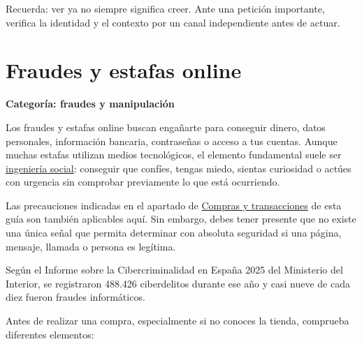 \documentclass[
  spanish,
  a4paper,
  openany]{book}
\begin{document}
Recuerda: ver ya no siempre significa creer. Ante una petición importante, verifica la identidad y el contexto por un canal independiente antes de actuar.

\section{Fraudes y estafas online}\label{fraudes-y-estafas-online}

\textbf{Categoría: fraudes y manipulación}

Los fraudes y estafas online buscan engañarte para conseguir dinero, datos personales, información bancaria, contraseñas o acceso a tus cuentas. Aunque muchas estafas utilizan medios tecnológicos, el elemento fundamental suele ser \href{https://es.wikipedia.org/wiki/Ingeniería_social_(seguridad_informática)}{ingeniería social}: conseguir que confíes, tengas miedo, sientas curiosidad o actúes con urgencia sin comprobar previamente lo que está ocurriendo.

Las precauciones indicadas en el apartado de \hyperref[compras-y-transacciones]{Compras y transacciones} de esta guía son también aplicables aquí. Sin embargo, debes tener presente que no existe una única señal que permita determinar con absoluta seguridad si una página, mensaje, llamada o persona es legítima.

Según el Informe sobre la Cibercriminalidad en España 2025 del Ministerio del Interior, se registraron 488.426 ciberdelitos durante ese año y casi nueve de cada diez fueron fraudes informáticos.

Antes de realizar una compra, especialmente si no conoces la tienda, comprueba diferentes elementos:
\end{document}
